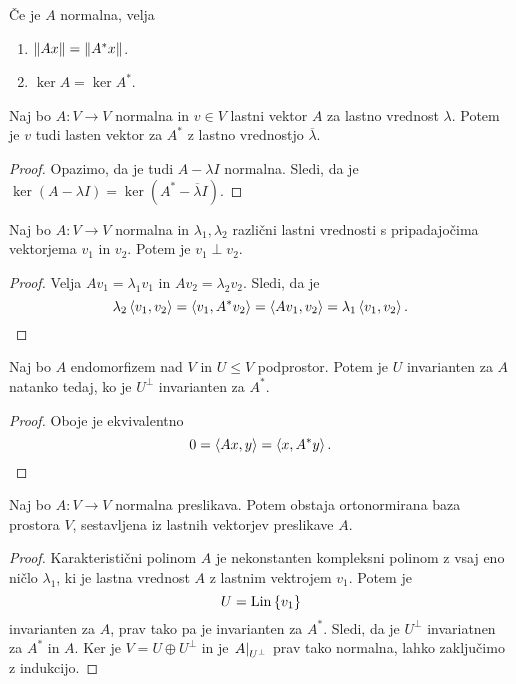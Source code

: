 \documentclass[12pt, a4paper]{article}
\begin{document}
\begin{posledica}
Če je $A$ normalna, velja

\begin{enumerate}[label=\roman*)]
\item $\left\lVert Ax\right\rVert=\left\lVert A^*x\right\rVert$.
\item $\ker A=\ker A^*$.
\end{enumerate}
\end{posledica}

\begin{trditev}
Naj bo $A\colon V\to V$ normalna in $v\in V$ lastni vektor $A$ za lastno vrednost $\lambda$. Potem je $v$ tudi lasten vektor za $A^*$ z lastno vrednostjo $\overline{\lambda}$.
\end{trditev}

\begin{proof}
Opazimo, da je tudi $A-\lambda I$ normalna. Sledi, da je $\ker(A-\lambda I)=\ker(A^*-\overline{\lambda}I)$.
\end{proof}

\begin{trditev}
Naj bo $A\colon V\to V$ normalna in $\lambda_1,\lambda_2$ različni lastni vrednosti s pripadajočima vektorjema $v_1$ in $v_2$. Potem je $v_1\perp v_2$.
\end{trditev}

\begin{proof}
Velja $Av_1=\lambda_1v_1$ in $Av_2=\lambda_2v_2$. Sledi, da je
\[
\lambda_2\left\langle v_1,v_2\right\rangle=\left\langle v_1,A^*v_2\right\rangle=\left\langle Av_1,v_2\right\rangle=\lambda_1\left\langle v_1,v_2\right\rangle.\qedhere
\]
\end{proof}

\begin{trditev}
Naj bo $A$ endomorfizem nad $V$ in $U\leq V$ podprostor. Potem je $U$ invarianten za $A$ natanko tedaj, ko je $U^\bot$ invarianten za $A^*$.
\end{trditev}

\begin{proof}
Oboje je ekvivalentno
\[
0=\left\langle Ax,y\right\rangle=\left\langle x,A^*y\right\rangle.\qedhere
\]
\end{proof}

\begin{izrek}
Naj bo $A\colon V\to V$ normalna preslikava. Potem obstaja ortonormirana baza prostora $V$, sestavljena iz lastnih vektorjev preslikave $A$.
\end{izrek}

\begin{proof}
Karakteristični polinom $A$ je nekonstanten kompleksni polinom z vsaj eno ničlo $\lambda_1$, ki je lastna vrednost $A$ z lastnim vektrojem $v_1$. Potem je
\[
U=\operatorname{Lin}\left\{v_1\right\}
\]
invarianten za $A$, prav tako pa je invarianten za $A^*$. Sledi, da je $U^\bot$ invariatnen za $A^*$ in $A$. Ker je $V=U\oplus U^\bot$ in je $\left. A\right|_{U^\bot}^{}$ prav tako normalna, lahko zaključimo z indukcijo.
\end{proof}
\end{document}
